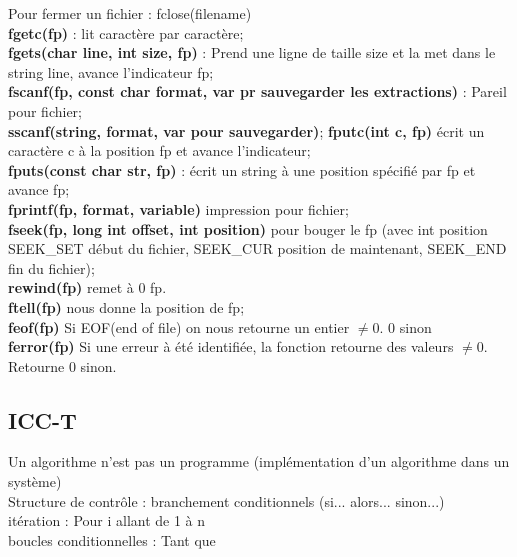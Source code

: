 \documentclass[../main.tex]{subfiles}
\begin{document}
Pour fermer un fichier : fclose(filename)\\
\textbf{fgetc(fp)} : lit caractère par caractère;\\
\textbf{fgets(char line, int size, fp)} : Prend une ligne de taille size et la met dans le string line, avance l'indicateur fp;\\
\textbf{fscanf(fp, const char format, var pr sauvegarder les extractions)} : Pareil pour fichier; \\
\textbf{sscanf(string, format, var pour sauvegarder)}; \textbf{fputc(int c, fp)} écrit un caractère c à la position fp et avance l'indicateur;\\
\textbf{fputs(const char str, fp)} : écrit un string à une position spécifié par fp et avance fp; \\
\textbf{fprintf(fp, format, variable)} impression pour fichier; \\
\textbf{fseek(fp, long int offset, int position)} pour bouger le fp (avec int position SEEK\_SET début du fichier, SEEK\_CUR position de maintenant, SEEK\_END fin du fichier);\\
\textbf{rewind(fp)} remet à 0 fp.\\
\textbf{ftell(fp)} nous donne la position de fp;\\
\textbf{feof(fp)} Si EOF(end of file) on nous retourne un entier $\neq 0$. 0 sinon\\
\textbf{ferror(fp)} Si une erreur à été identifiée, la fonction retourne des valeurs $\neq 0$. Retourne 0 sinon. \\

\subsection{ICC-T}
Un algorithme n'est pas un programme (implémentation d'un algorithme dans un système)\\
Structure de contrôle : branchement conditionnels (si... alors... sinon...)\\
itération : Pour i allant de 1 à n\\
boucles conditionnelles : Tant que \\
\end{document}
